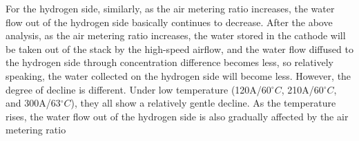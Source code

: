 \par
For the hydrogen side, similarly, as the air metering ratio increases, the water flow out of the hydrogen side basically continues to decrease. After the above analysis, as the air metering ratio increases, the water stored in the cathode will be taken out of the stack by the high-speed airflow, and the water flow diffused to the hydrogen side through concentration difference becomes less, so relatively speaking, the water collected on the hydrogen side will become less. However, the degree of decline is different. Under low temperature (120A/60$^{\circ}C$, 210A/60$^{\circ}C$, and 300A/63$^{\circ}C$), they all show a relatively gentle decline. As the temperature rises, the water flow out of the hydrogen side is also gradually affected by the air metering ratio

